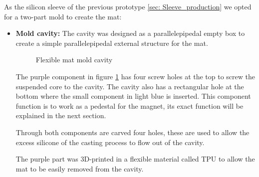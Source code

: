 As the silicon sleeve of the previous prototype \ref{sec: Sleeve_production} we opted for a two-part mold to create the mat:
\begin{itemize}
    \item \textbf{Mold cavity: } The cavity was designed as a parallelepipedal empty box to create a simple parallelepipedal external structure for the mat.
    \begin{figure}
        \centering
        \caption{Flexible mat mold cavity}
        \label{fig: mat_mold_cavity}
    \end{figure}
    The purple component in figure \ref{fig: mat_mold_cavity} has four screw holes at the top to screw the suspended core to the cavity.
    The cavity also has a rectangular hole at the bottom where the small component in light blue is inserted.
    This component function is to work as a pedestal for the magnet, its exact function will be explained in the next section.

    Through both components are carved four holes, these are used to allow the excess silicone of the casting process to flow out of the cavity.

    The purple part was 3D-printed in a flexible material called TPU to allow the mat to be easily removed from the cavity.


\end{itemize}
